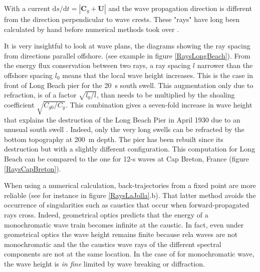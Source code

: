 With a current $\mathrm{d}s/\mathrm{d}t=\left|{\mathbf C}_g+{\mathbf
U}\right|$ and the wave propagation direction is different from the direction
perpendicular to wave crests. These "rays" have long been calculated by hand
\citep{Munk&Traylor1947} before numerical methods took over \cite{Dobson1967}.
 
 It is very insightful to look at wave plans, the diagrams showing the ray spacing from directions parallel offshore. (see example in figure
 \ref{RaysLongBeach}). From the energy flux conservation between two rays, a ray spacing $l$ narrower than the offshore spacing $l_0$ means 
 that the local wave height increases. This is the case in front of Long Beach pier
 for the 20~s south swell. This augmentation only due to refraction, is of a factor $\sqrt{l_0/l}$,
 than needs to be multiplied by the shoaling coefficient $\sqrt{C_{g0}/C_g}$. This combination gives a seven-fold increase in wave height that explains the destruction of the Long Beach Pier
in April 1930 due to an unusual south swell \citep{Lacombe1950}. Indeed, only the very long swells can be refracted by the bottom topography at 200~m depth.
The pier has been rebuilt since its destruction but with a slightly different configuration.
This computation for Long Beach can be compared to the one for 12-s waves at Cap Breton, France (figure \ref{RaysCapBreton}). 

 When using a numerical calculation, back-trajectories from a fixed point are more reliable 
 (see for instance in figure \ref{RaysLaJolla}.b). That latter method avoids the occurrence of singularities such as 
 caustics that occur when forward-propagated rays cross. Indeed, geometrical optics predicts that the energy of a monochromatic wave train becomes infinite at the caustic. In fact, even under geometrical optics the 
wave height remains finite because rela waves are not monochromatic and the the caustics wave rays of the different spectral components are not at the same location. In the case of for monochromatic wave, the wave height is \textit{in fine} limited by wave breaking
or diffraction.  

